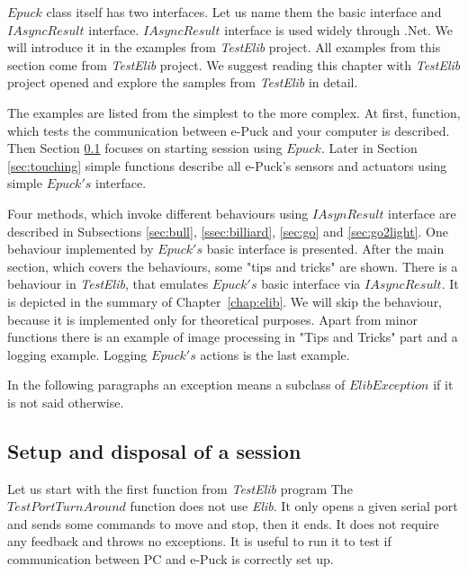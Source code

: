   $Epuck$ class itself has two interfaces. Let us name them the basic interface and 
  $IAsyncResult$ interface. $IAsyncResult$ interface is used widely through .Net. 
  We will introduce it in the examples from {\it TestElib} project.
  All examples from this section come from {\it TestElib} project. 
  We suggest reading this chapter with {\it TestElib} project opened
  and explore the samples from {\it TestElib} in detail.


  The examples are listed from the simplest to the more complex. 
  At first, function, which tests the communication between e-Puck and your computer is described.
  Then Section \ref{sec:session} focuses on starting session using $Epuck$.
  Later in Section \ref{sec:touching} simple functions describe all e-Puck's sensors and actuators using simple $Epuck's$ interface.
  
  Four methods, which invoke different behaviours using $IAsynResult$ 
  interface are described in Subsections
  \ref{sec:bull}, \ref{ssec:billiard}, \ref{sec:go} and \ref{sec:go2light}.
  One behaviour implemented by $Epuck's$ basic interface is presented.
  After the main section, which covers the behaviours, some "tips and tricks" are shown.
  There is a behaviour in {\it TestElib}, that emulates $Epuck's$ basic interface via $IAsyncResult$. 
  It is depicted in the summary of Chapter~\ref{chap:elib}.
  We will skip the behaviour, because it is implemented only for theoretical purposes.
  Apart from minor functions there is an example of image processing in "Tips and Tricks" part and a logging example.
  Logging $Epuck's$ actions is the last example.
  \begin{remark}
  In the following paragraphs an exception means a subclass of $ElibException$ if it is not said otherwise.
  \end{remark}
    
\subsection{Setup and disposal of a session}\label{sec:session}
  Let us start with the first function from {\it TestElib} program
  The $TestPortTurnAround$ function does not use {\it Elib}.  It only opens a given serial port
  and sends some commands to move and stop, then it ends. 
  It does not require any feedback and throws no exceptions.
  It is useful to run it to test if communication between PC and e-Puck is correctly set up.

